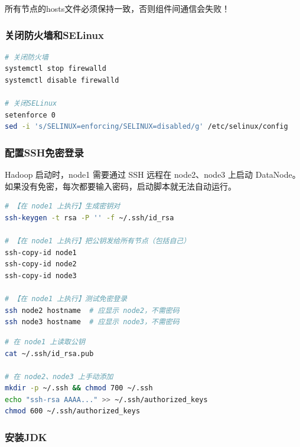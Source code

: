 \documentclass[12pt,a4paper]{article}
\begin{document}
\begin{warnbox}[注意]
所有节点的hosts文件必须保持一致，否则组件间通信会失败！
\end{warnbox}

\subsubsection{关闭防火墙和SELinux}

\begin{lstlisting}[language=bash]
# 关闭防火墙
systemctl stop firewalld
systemctl disable firewalld

# 关闭SELinux
setenforce 0
sed -i 's/SELINUX=enforcing/SELINUX=disabled/g' /etc/selinux/config
\end{lstlisting}

\subsubsection{配置SSH免密登录}

\begin{theorybox}[为什么要配置SSH免密？]
Hadoop 启动时，node1 需要通过 SSH 远程在 node2、node3 上启动 DataNode。如果没有免密，每次都要输入密码，启动脚本就无法自动运行。
\end{theorybox}

\begin{lstlisting}[language=bash]
# 【在 node1 上执行】生成密钥对
ssh-keygen -t rsa -P '' -f ~/.ssh/id_rsa

# 【在 node1 上执行】把公钥发给所有节点（包括自己）
ssh-copy-id node1
ssh-copy-id node2
ssh-copy-id node3

# 【在 node1 上执行】测试免密登录
ssh node2 hostname  # 应显示 node2，不需密码
ssh node3 hostname  # 应显示 node3，不需密码
\end{lstlisting}

\begin{tipbox}
\begin{lstlisting}[language=bash]
# 在 node1 上读取公钥
cat ~/.ssh/id_rsa.pub

# 在 node2、node3 上手动添加
mkdir -p ~/.ssh && chmod 700 ~/.ssh
echo "ssh-rsa AAAA..." >> ~/.ssh/authorized_keys
chmod 600 ~/.ssh/authorized_keys
\end{lstlisting}
\end{tipbox}

\subsubsection{安装JDK}
\end{document}
